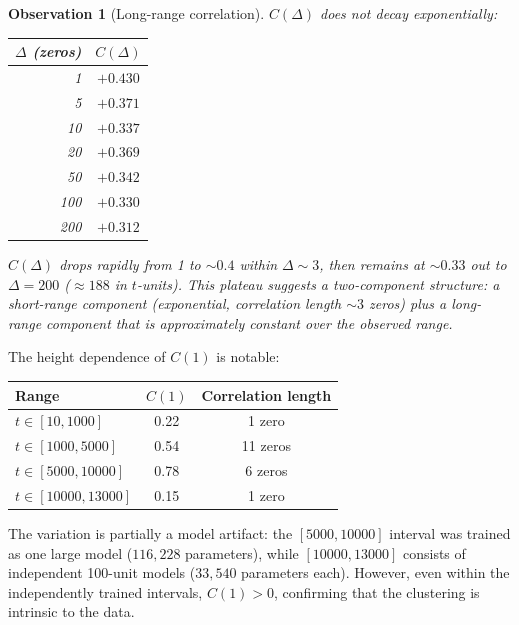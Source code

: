 \documentclass[11pt,a4paper]{article}
\newtheorem{observation}[theorem]{Observation}
\begin{document}
\begin{observation}[Long-range correlation]\label{obs:longrange}
$C(\Delta)$ does not decay exponentially:
\begin{center}
\begin{tabular}{rc}
\toprule
$\Delta$ (zeros) & $C(\Delta)$ \\
\midrule
1   & $+0.430$ \\
5   & $+0.371$ \\
10  & $+0.337$ \\
20  & $+0.369$ \\
50  & $+0.342$ \\
100 & $+0.330$ \\
200 & $+0.312$ \\
\bottomrule
\end{tabular}
\end{center}

$C(\Delta)$ drops rapidly from 1 to $\sim 0.4$ within $\Delta \sim 3$, then remains
at $\sim 0.33$ out to $\Delta = 200$ ($\approx 188$ in $t$-units).
This plateau suggests a two-component structure:
a short-range component (exponential, correlation length $\sim 3$ zeros)
plus a long-range component that is approximately constant over the observed range.
\end{observation}

The height dependence of $C(1)$ is notable:
\begin{center}
\begin{tabular}{lcc}
\toprule
\textbf{Range} & $C(1)$ & \textbf{Correlation length} \\
\midrule
$t \in [10, 1000]$     & 0.22 & 1 zero \\
$t \in [1000, 5000]$   & 0.54 & 11 zeros \\
$t \in [5000, 10000]$  & 0.78 & 6 zeros \\
$t \in [10000, 13000]$ & 0.15 & 1 zero \\
\bottomrule
\end{tabular}
\end{center}

The variation is partially a model artifact:
the $[5000, 10000]$ interval was trained as one large model ($116{,}228$ parameters),
while $[10000, 13000]$ consists of independent 100-unit models ($33{,}540$ parameters each).
However, even within the independently trained intervals, $C(1) > 0$,
confirming that the clustering is intrinsic to the data.

\end{document}
